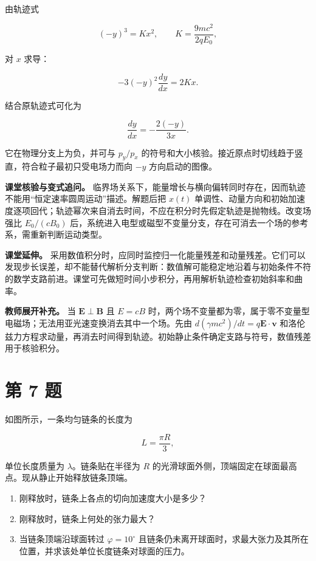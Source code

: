 \documentclass[12pt,a4paper,UTF8]{ctexart}
\newcommand{\tightlist}{\setlength{\itemsep}{0pt}\setlength{\parskip}{0pt}}
\begin{document}
由轨迹式

\[
(-y)^3=Kx^2,
\qquad K=\frac{9mc^2}{2qE_0},
\]

对 \(x\) 求导：

\[
-3(-y)^2\frac{dy}{dx}=2Kx.
\]

结合原轨迹式可化为

\[
\frac{dy}{dx}=-\frac{2(-y)}{3x}.
\]

它在物理分支上为负，并可与 \(p_y/p_x\)
的符号和大小核验。接近原点时切线趋于竖直，符合粒子最初只受电场力而向
\(-y\) 方向启动的图像。

\textbf{课堂核验与变式追问。}
临界场关系下，能量增长与横向偏转同时存在，因而轨迹不能用``恒定速率圆周运动''描述。解题后把
\(x(t)\)
单调性、动量方向和初始加速度逐项回代；轨迹幂次来自消去时间，不应在积分时先假定轨迹是抛物线。改变场强比
\(E_0/(cB_0)\)
后，系统进入电型或磁型不变量分支，存在可消去一个场的参考系，需重新判断运动类型。

\textbf{课堂延伸。}
采用数值积分时，应同时监控归一化能量残差和动量残差。它们可以发现步长误差，却不能替代解析分支判断：数值解可能稳定地沿着与初始条件不符的数学支路前进。课堂可先做短时间小步积分，再用解析轨迹检查初始斜率和曲率。

\textbf{教师展开补充。} 当 \(\boldsymbol E\perp\boldsymbol B\) 且
\(E=cB\)
时，两个场不变量都为零，属于零不变量型电磁场；无法用亚光速变换消去其中一个场。先由
\(d(\gamma mc^2)/dt=q\boldsymbol E\cdot\boldsymbol v\)
和洛伦兹力方程求动量，再消去时间得到轨迹。初始静止条件确定支路与符号，数值残差用于核验积分。

\newpage

\section{第 7 题}\label{ux7b2c-7-ux9898}

如图所示，一条均匀链条的长度为

\[
L=\frac{\pi R}{3},
\]

单位长度质量为 \(\lambda\)。链条贴在半径为 \(R\)
的光滑球面外侧，顶端固定在球面最高点。现从静止开始释放链条顶端。

\begin{enumerate}
\def\labelenumi{\arabic{enumi}.}
\tightlist
\item
  刚释放时，链条上各点的切向加速度大小是多少？
\item
  刚释放时，链条上何处的张力最大？
\item
  当链条顶端沿球面转过 \(\varphi=10^\circ\)
  且链条仍未离开球面时，求最大张力及其所在位置，并求该处单位长度链条对球面的压力。
\end{enumerate}
\end{document}
